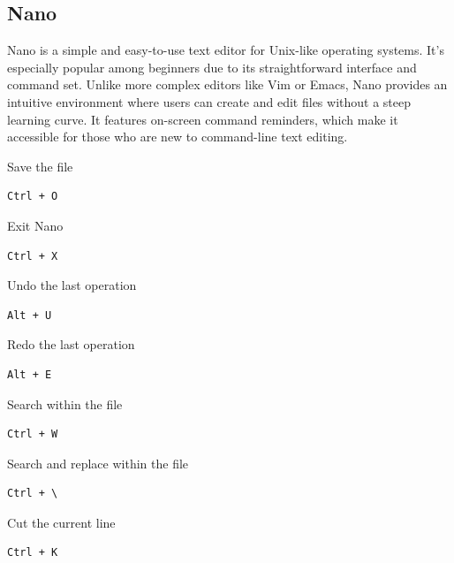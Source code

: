 \documentclass{article}
\newenvironment{codetemplate}[1][]{%
  \mybasecolorbox[#1]
  \itshape
}{%
  \endmybasecolorbox
}
\begin{document}
\subsection{Nano}
Nano is a simple and easy-to-use text editor for Unix-like operating systems. It's especially popular among beginners due to its straightforward interface and command set. Unlike more complex editors like Vim or Emacs, Nano provides an intuitive environment where users can create and edit files without a steep learning curve. It features on-screen command reminders, which make it accessible for those who are new to command-line text editing.

Save the file
\begin{codetemplate}{}
\begin{verbatim}
Ctrl + O
\end{verbatim}
\end{codetemplate}

Exit Nano
\begin{codetemplate}{}
\begin{verbatim}
Ctrl + X
\end{verbatim}
\end{codetemplate}

Undo the last operation
\begin{codetemplate}{}
\begin{verbatim}
Alt + U
\end{verbatim}
\end{codetemplate}

Redo the last operation
\begin{codetemplate}{}
\begin{verbatim}
Alt + E
\end{verbatim}
\end{codetemplate}

Search within the file
\begin{codetemplate}{}
\begin{verbatim}
Ctrl + W
\end{verbatim}
\end{codetemplate}

Search and replace within the file
\begin{codetemplate}{}
\begin{verbatim}
Ctrl + \
\end{verbatim}
\end{codetemplate}

Cut the current line
\begin{codetemplate}{}
\begin{verbatim}
Ctrl + K
\end{verbatim}
\end{codetemplate}
\end{document}
